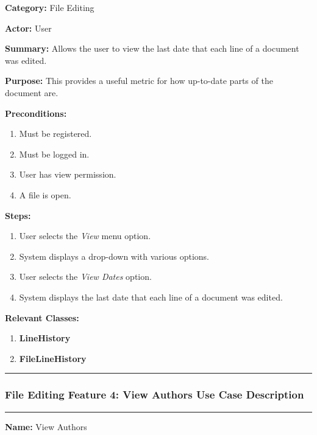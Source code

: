 \documentclass[twoside,letterpaper]{article}
\begin{document}
		\noindent\textbf{Category:} File Editing \newline
	
		\noindent\textbf{Actor:} User \newline
		
		\noindent\textbf{Summary:} Allows the user to view the last date that each line of a document was edited. \newline
		
		\noindent\textbf{Purpose:} This provides a useful metric for how up-to-date parts of the document are. \newline
		
		\noindent\textbf{Preconditions:}
		\begin{enumerate}
			\item Must be registered.
			\item Must be logged in.
			\item User has view permission.
			\item A file is open.
		\end{enumerate}
		\noindent\textbf{Steps:}
		\begin{enumerate}
			\item User selects the \textit{View} menu option.
			\item System displays a drop-down with various options.
			\item User selects the \textit{View Dates} option.
			\item System displays the last date that each line of a document was edited.
		\end{enumerate}
		\noindent\textbf{Relevant Classes:}
		\begin{enumerate}
			\item \textbf {LineHistory}
			\item \textbf {FileLineHistory}
		\end{enumerate}
	\vspace{8pt}
	\hrule
	\newpage
	
	\subsubsection[File Editing Feature 4: View Authors]{\rmfamily\bfseries\color{black}
		File Editing Feature 4: View Authors Use Case Description}
	\hypertarget{RefHeading22059017292}{}
	
	\vspace{2pt}
	\hrule
	\vspace{8pt}
		\noindent\textbf{Name:} View Authors \newline
		
\end{document}
